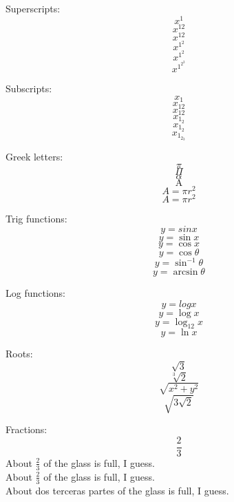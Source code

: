 \documentclass{article}
\newcommand{\Alpha}{\mathrm{A}}
\begin{document}
Superscripts:
\[x^1\] %
\[x^12\] %
\[x^{12}\] %
\[x^{1^2}\] %
\[x^{1^{2}}\] %
\[x^{1^{2^{3}}}\] %

Subscripts:
\[x_1\] %
\[x_12\] %
\[x_{12}\] %
\[x_{1_2}\] %
\[x_{1_{2}}\] %
\[x_{1_{2_{3}}}\] %


Greek letters:
\[\pi\]
\[\Pi\]
\[\alpha\] %
\[\Alpha\] %
\[A=\pi r^{2}\] %
\[A=\pi{}r^{2}\] %

Trig functions:
\[y=sin{}x\] %
\[y=\sin{x}\] %
\[y=\cos{x}\]
\[y=\cos{\theta}\] %
\[y=\sin^{-1}{\theta}\]
\[y=\arcsin{\theta}\] %

Log functions:
\[y=logx\] %
\[y=\log{x}\]
\[y=\log_{12}{x}\]
\[y=\ln{x}\]

Roots:
\[\sqrt{3}\]
\[\sqrt[3]{2}\] %
\[\sqrt{x^2+y^2}\]
\[\sqrt{3\sqrt{2}}\]

Fractions:
\[\frac{2}{3}\]
About \(\frac{2}{3}\) of the glass is full, I guess.\\
%
About \(\frac{2}{3}\) of the glass is full, I guess.\\ [2pt] %
%
About dos terceras partes of the glass is full, I guess. %
\end{document}
